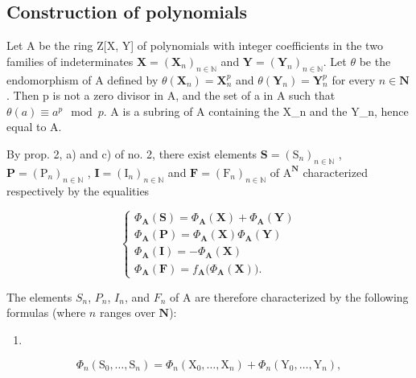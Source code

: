 \subsection{Construction of polynomials}

Let A be the ring Z{[}X, Y{]} of polynomials with integer coefficients in the two families of indeterminates \(\mathbf{X} = (\mathbf{X}_{n})_{n \in \mathbb{N}}\) and \(\mathbf{Y} = (\mathbf{Y}_{n})_{n \in \mathbb{N}}\). Let \(\theta\) be the endomorphism of A defined by \(\theta(\mathbf{X}_{n}) = \mathbf{X}_{n}^{p}\) and \(\theta(\mathbf{Y}_{n}) = \mathbf{Y}_{n}^{p}\) for every \(n \in \mathbf{N}\). Then p is not a zero divisor in A, and the set of a in A such that \(\theta(a) \equiv a^{p} \mod p\). A is a subring of A containing the X\_n and the Y\_n, hence equal to A.

By prop. 2, a) and c) of no. 2, there exist elements \(\mathbf{S} = (\mathrm{S}_{n})_{n\in\mathbb{N}}\) , \(\mathbf{P} = (\mathrm{P}_{n})_{n\in\mathbb{N}}\) , \(\mathbf{I} = (\mathrm{I}_{n})_{n\in\mathbb{N}}\) and \(\mathbf{F} = (\mathrm{F}_{n})_{n\in\mathbb{N}}\) of \(\mathrm{A}^{\mathbf{N}}\) characterized respectively by the equalities

\[
\left\{ \begin{array}{l} \Phi_ {\mathbf {A}} (\mathbf {S}) = \Phi_ {\mathbf {A}} (\mathbf {X}) + \Phi_ {\mathbf {A}} (\mathbf {Y}) \\ \Phi_ {\mathbf {A}} (\mathbf {P}) = \Phi_ {\mathbf {A}} (\mathbf {X}) \Phi_ {\mathbf {A}} (\mathbf {Y}) \\ \Phi_ {\mathbf {A}} (\mathbf {I}) = - \Phi_ {\mathbf {A}} (\mathbf {X}) \\ \Phi_ {\mathbf {A}} (\mathbf {F}) = f _ {\mathbf {A}} \big (\Phi_ {\mathbf {A}} (\mathbf {X}) \big). \end{array} \right.\tag{11}
\]

The elements \(S_{n}\), \(P_{n}\), \(I_{n}\), and \(F_{n}\) of A are therefore characterized by the following formulas (where \(n\) ranges over \(\mathbf{N}\)):

\begin{enumerate}
\def\labelenumi{(\arabic{enumi})}
\setcounter{enumi}{11}
\tightlist
\item
\end{enumerate}

\[
\Phi_ {n} \left(\mathrm{S} _ {0}, \dots , \mathrm{S} _ {n}\right) = \Phi_ {n} \left(\mathrm{X} _ {0}, \dots , \mathrm{X} _ {n}\right) + \Phi_ {n} \left(\mathrm{Y} _ {0}, \dots , \mathrm{Y} _ {n}\right),\tag{13}
\]

